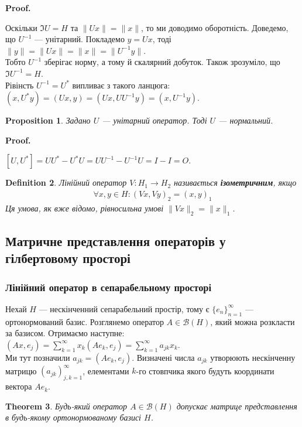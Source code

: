 \documentclass[a4paper, 10pt]{article}
\makeatletter
\theoremstyle{theoremdd}
\newtheorem{theorem}{Theorem}[subsection]
\theoremstyle{theoremdd}
\newtheorem{definition}[theorem]{Definition}
\theoremstyle{theoremdd}
\theoremstyle{theoremdd}
\theoremstyle{theoremdd}
\newtheorem{proposition}[theorem]{Proposition}
\theoremstyle{theoremdd}
\theoremstyle{theoremdd}
\theoremstyle{theoremdd}
\renewenvironment{proof}[1][Proof.\\]{\par
\pushQED{\hfill \qed}%
\normalfont \topsep6\p@\@plus6\p@\relax
\trivlist
\item\relax
{\bfseries
#1\@addpunct{.}}\hspace\labelsep\ignorespaces
}{%
\popQED\endtrivlist\@endpefalse
}
\makeatother
\begin{document}
\begin{proof}
Оскільки $\Im U = H$ та $\|Ux\| = \|x\|$, то ми доводимо оборотність. Доведемо, що $U^{-1}$ --- унітарний. Покладемо $y = Ux$, тоді\\
$\|y\| = \|Ux\| = \|x\| = \|U^{-1}y\|$.\\
Тобто $U^{-1}$ зберігає норму, а тому й скалярний добуток. Також зрозуміло, що $\Im U^{-1} = H$.\\
Рівінсть $U^{-1} = U^*$ випливає з такого ланцюга: $(x, U^*y) = (Ux,y) = (Ux, UU^{-1}y) = (x,U^{-1}y)$.
\end{proof}

\begin{proposition}
Задано $U$ --- унітарний оператор. Тоді $U$ --- нормальний.
\end{proposition}

\begin{proof}
$[U,U^*] = UU^* - U^*U = UU^{-1} - U^{-1}U = I - I = O$.
\end{proof}

\begin{definition}
Лінійний оператор $V \colon H_1 \to H_2$ називається \textbf{ізометричним}, якщо
\begin{align*}
\forall x,y \in H: (Vx,Vy)_2 = (x,y)_1
\end{align*}
Ця умова, як вже відомо, рівносильна умові $\|Vx\|_2 = \|x\|_1$.
\end{definition}

\subsection{Матричне представлення операторів у гілбертовому просторі}
\subsubsection{Лінійний оператор в сепарабельному просторі}
Нехай $H$ --- нескінченний сепарабельний простір, тому є $\{e_n\}_{n=1}^\infty$ --- ортонормований базис. Розглянемо оператор $A \in \mathcal{B}(H)$, який можна розкласти за базисом. Отримаємо наступне:\\
$(Ax, e_j) = \displaystyle\sum_{k=1}^\infty x_k (Ae_k, e_j) = \sum_{k=1}^\infty a_{jk} x_k$.\\
Ми тут позначили $a_{jk} = (Ae_k, e_j)$. Визначені числа $a_{jk}$ утворюють нескінченну матрицю $(a_{jk})_{j,k=1}^\infty$, елементами $k$-го стовпчика якого будуть координати вектора $Ae_k$.

\begin{theorem}
Будь-який оператор $A \in \mathcal{B}(H)$ допускає матрице представлення в будь-якому ортонормованому базисі $H$.
\end{theorem}
\end{document}
